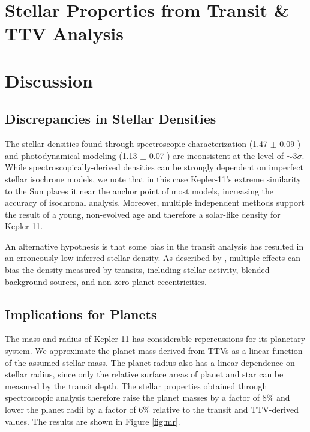 \documentclass[oneside]{emulateapj}
\begin{document}



\section{Stellar Properties from Transit \& TTV Analysis}

\section{Discussion}
\subsection{Discrepancies in Stellar Densities}

The stellar densities found through spectroscopic characterization (1.47 $\pm$ 0.09 \gcm) and photodynamical modeling (1.13 $\pm$ 0.07 \gcm) are inconsistent at the level of $\sim$3$\sigma$. While spectroscopically-derived densities can be strongly dependent on imperfect stellar isochrone models, we note that in this case Kepler-11's extreme similarity to the Sun places it near the anchor point of most models, increasing the accuracy of isochronal analysis. Moreover, multiple independent methods support the result of a young, non-evolved age and therefore a solar-like density for Kepler-11.

An alternative hypothesis is that some bias in the transit analysis has resulted in an erroneously low inferred stellar density. As described by \citet{Kipping2014}, multiple effects can bias the density measured by transits, including stellar activity, blended background sources, and non-zero planet eccentricities. 

\subsection{Implications for Planets}

The mass and radius of Kepler-11 has considerable repercussions for its planetary system. We approximate the planet mass derived from TTVs as a linear function of the assumed stellar mass. The planet radius also has a linear dependence on stellar radius, since only the relative surface areas of planet and star can be measured by the transit depth. The stellar properties obtained through spectroscopic analysis therefore raise the planet masses by a factor of 8\% and lower the planet radii by a factor of 6\% relative to the transit and TTV-derived values. The results are shown in Figure \ref{fig:mr}.
\end{document}
